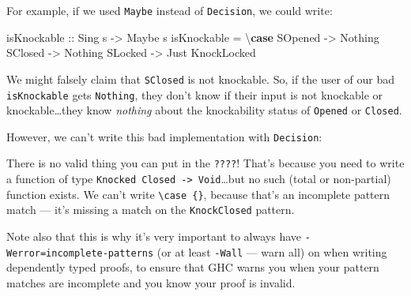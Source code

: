 \documentclass[]{article}
\newenvironment{Shaded}{}{}
\newcommand{\CommentTok}[1]{\textcolor[rgb]{0.38,0.63,0.69}{\textit{#1}}}
\newcommand{\DataTypeTok}[1]{\textcolor[rgb]{0.56,0.13,0.00}{#1}}
\newcommand{\FunctionTok}[1]{\textcolor[rgb]{0.02,0.16,0.49}{#1}}
\newcommand{\KeywordTok}[1]{\textcolor[rgb]{0.00,0.44,0.13}{\textbf{#1}}}
\newcommand{\NormalTok}[1]{#1}
\newcommand{\OtherTok}[1]{\textcolor[rgb]{0.00,0.44,0.13}{#1}}
\begin{document}
For example, if we used \texttt{Maybe} instead of \texttt{Decision}, we could
write:

\begin{Shaded}
\begin{Highlighting}[]
\OtherTok{isKnockable ::} \DataTypeTok{Sing}\NormalTok{ s }\OtherTok{->} \DataTypeTok{Maybe}\NormalTok{ s}
\NormalTok{isKnockable }\FunctionTok{=}\NormalTok{ \textbackslash{}}\KeywordTok{case}
    \DataTypeTok{SOpened} \OtherTok{->} \DataTypeTok{Nothing}
    \DataTypeTok{SClosed} \OtherTok{->} \DataTypeTok{Nothing}
    \DataTypeTok{SLocked} \OtherTok{->} \DataTypeTok{Just} \DataTypeTok{KnockLocked}
\end{Highlighting}
\end{Shaded}

We might falsely claim that \texttt{SClosed} is not knockable. So, if the user
of our bad \texttt{isKnockable} gets \texttt{Nothing}, they don't know if their
input is not knockable or knockable\ldots{}they know \emph{nothing} about the
knockability status of \texttt{\textquotesingle{}Opened} or
\texttt{\textquotesingle{}Closed}.

However, we can't write this bad implementation with \texttt{Decision}:

\begin{Shaded}
\end{Shaded}

There is no valid thing you can put in the \texttt{????}! That's because you
need to write a function of type
\texttt{Knocked\ \textquotesingle{}Closed\ -\textgreater{}\ Void}\ldots{}but no
such (total or non-partial) function exists. We can't write
\texttt{\textbackslash{}case\ \{\}}, because that's an incomplete pattern match
--- it's missing a match on the \texttt{KnockClosed} pattern.

Note also that this is why it's very important to always have
\texttt{-Werror=incomplete-patterns} (or at least \texttt{-Wall} --- warn all)
on when writing dependently typed proofs, to ensure that GHC warns you when your
pattern matches are incomplete and you know your proof is invalid.
\end{document}
